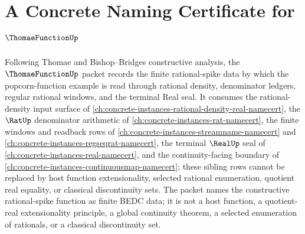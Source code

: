 \chapter{A Concrete Naming Certificate for $\ThomaeFunctionUp$}
\label{ch:concrete-instances-thomae-function-namecert}

Following Thomae and Bishop--Bridges constructive analysis, the $\ThomaeFunctionUp$ packet records the finite rational-spike data by which the popcorn-function example is read through rational density, denominator ledgers, regular rational windows, and the terminal Real seal. It consumes the rational-density input surface of \autoref{ch:concrete-instances-rational-density-real-namecert}, the $\RatUp$ denominator arithmetic of \autoref{ch:concrete-instances-rat-namecert}, the finite windows and readback rows of \autoref{ch:concrete-instances-streamname-namecert} and \autoref{ch:concrete-instances-regseqrat-namecert}, the terminal $\RealUp$ seal of \autoref{ch:concrete-instances-real-namecert}, and the continuity-facing boundary of \autoref{ch:concrete-instances-continuousmap-namecert}; these sibling rows cannot be replaced by host function extensionality, selected rational enumeration, quotient real equality, or classical discontinuity sets. The packet names the constructive rational-spike function as finite BEDC data; it is not a host function, a quotient-real extensionality principle, a global continuity theorem, a selected enumeration of rationals, or a classical discontinuity set.


